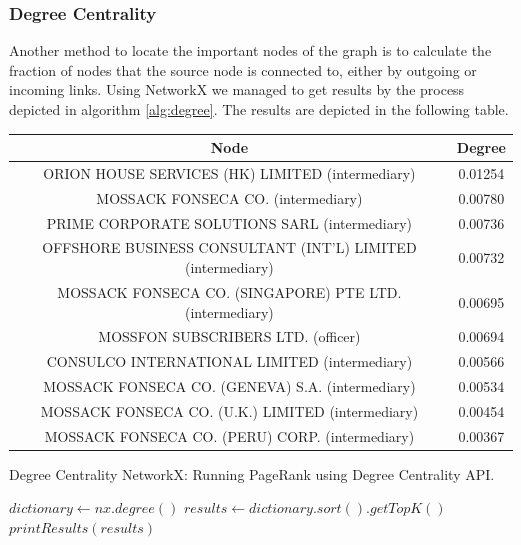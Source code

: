 \documentclass[sigconf, nonacm]{acmart}
\begin{document}
\subsubsection{Degree Centrality}
Another method to locate the important nodes of the graph is to calculate the fraction of nodes that the source node is connected to, either by outgoing or incoming links. Using NetworkX we managed to get results by the process depicted in algorithm \ref{alg:degree}. The results are depicted in the following table.

\begin{center}
\begin{adjustbox}{width=\columnwidth,center}
\begin{tabular}{||c | c||} 
 \hline
 Node & Degree \\ [0.5ex] 
 \hline\hline
 ORION HOUSE SERVICES (HK) LIMITED (intermediary) & 0.01254 \\ 
 \hline
MOSSACK FONSECA CO. (intermediary) & 0.00780 \\
 \hline
PRIME CORPORATE SOLUTIONS SARL (intermediary) & 0.00736 \\
 \hline
OFFSHORE BUSINESS CONSULTANT (INT'L) LIMITED (intermediary) & 0.00732 \\
 \hline
MOSSACK FONSECA CO. (SINGAPORE) PTE LTD. (intermediary) & 0.00695 \\
 \hline
MOSSFON SUBSCRIBERS LTD. (officer) & 0.00694 \\
 \hline
CONSULCO INTERNATIONAL LIMITED (intermediary) & 0.00566 \\
 \hline
MOSSACK FONSECA CO. (GENEVA) S.A. (intermediary) & 0.00534 \\
 \hline
MOSSACK FONSECA CO. (U.K.) LIMITED (intermediary) & 0.00454 \\
 \hline
MOSSACK FONSECA CO. (PERU) CORP. (intermediary) & 0.00367 \\
 \hline
\end{tabular}
\end{adjustbox}
\end{center}

\begin{algorithm}
\caption{Degree Centrality NetworkX: Running PageRank using Degree Centrality API.}\label{alg:degree}
\begin{algorithmic}

\State $dictionary \gets nx.degree()$
\State $results \gets dictionary.sort().getTopK()$
\State $printResults(results)$

\end{algorithmic}
\end{algorithm}
\end{document}
